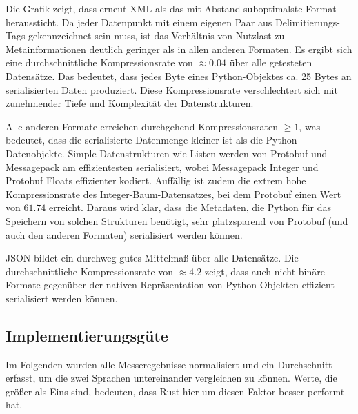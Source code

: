 \documentclass[ngerman]{seminarvorlage}
\begin{document}
Die Grafik zeigt, dass erneut XML als das mit Abstand suboptimalste Format heraussticht. Da jeder Datenpunkt mit einem eigenen Paar aus Delimitierungs-Tags gekennzeichnet sein muss, ist das Verhältnis von Nutzlast zu Metainformationen deutlich geringer als in allen anderen Formaten. Es ergibt sich eine durchschnittliche Kompressionsrate von $\approx 0.04$ über alle getesteten Datensätze. Das bedeutet, dass jedes Byte eines Python-Objektes ca. 25 Bytes an serialisierten Daten produziert. Diese Kompressionsrate verschlechtert sich mit zunehmender Tiefe und Komplexität der Datenstrukturen.

Alle anderen Formate erreichen durchgehend Kompressionsraten $\geq 1$, was bedeutet, dass die serialisierte Datenmenge kleiner ist als die Python-Datenobjekte. Simple Datenstrukturen wie Listen werden von Protobuf und Messagepack am effizientesten serialisiert, wobei Messagepack Integer und Protobuf Floats effizienter kodiert. Auffällig ist zudem die extrem hohe Kompressionsrate des Integer-Baum-Datensatzes, bei dem Protobuf einen Wert von $61.74$ erreicht. Daraus wird klar, dass die Metadaten, die Python für das Speichern von solchen Strukturen benötigt, sehr platzsparend von Protobuf (und auch den anderen Formaten) serialisiert werden können.

JSON bildet ein durchweg gutes Mittelmaß über alle Datensätze. Die durchschnittliche Kompressionsrate von $\approx 4.2$ zeigt, dass auch nicht-binäre Formate gegenüber der nativen Repräsentation von Python-Objekten effizient serialisiert werden können.

\subsection{Implementierungsgüte}
Im Folgenden wurden alle Messeregebnisse normalisiert und ein Durchschnitt erfasst, um die zwei Sprachen untereinander vergleichen zu können. Werte, die größer als Eins sind, bedeuten, dass Rust hier um diesen Faktor besser performt hat.

\begin{table}[H]
    \caption{Relative Performance von Rust gegenüber Python}
\end{table}
\end{document}
